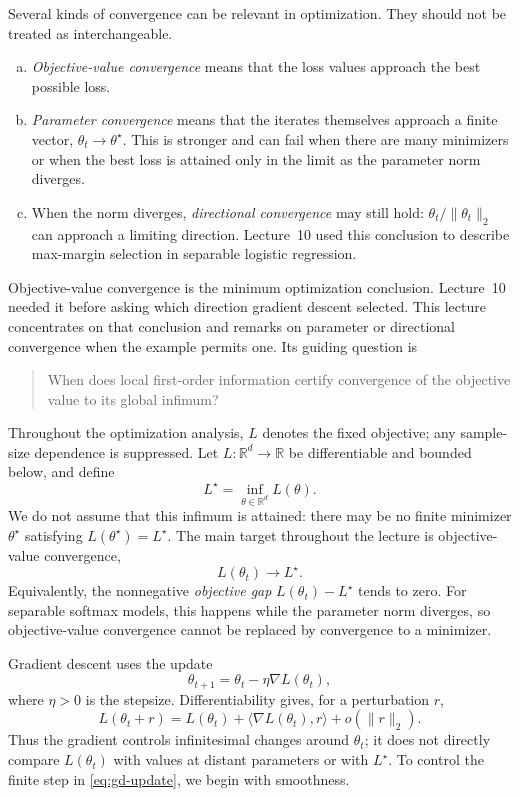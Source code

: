 \documentclass[11pt,twoside]{article}
\newcommand{\R}{\mathbb R}
\theoremstyle{definition}
\theoremstyle{remark}
\begin{document}
Several kinds of convergence can be relevant in optimization. They should not
be treated as interchangeable.
\begin{enumerate}[(a),leftmargin=*]
\item \emph{Objective-value convergence} means that the loss values approach
the best possible loss.
\item \emph{Parameter convergence} means that the iterates themselves approach
a finite vector, $\theta_t\to\theta^\star$. This is stronger and can fail when
there are many minimizers or when the best loss is attained only in the limit
as the parameter norm diverges.
\item When the norm diverges, \emph{directional convergence} may still hold:
$\theta_t/\|\theta_t\|_2$ can approach a limiting direction. Lecture~10 used
this conclusion to describe max-margin selection in separable logistic
regression.
\end{enumerate}
Objective-value convergence is the minimum optimization conclusion.
Lecture~10 needed it before asking which direction gradient descent selected.
This lecture concentrates on that conclusion and remarks on parameter or
directional convergence when the example permits one. Its guiding question is
\begin{quote}
When does local first-order information certify convergence of the objective
value to its global infimum?
\end{quote}

Throughout the optimization analysis, $L$ denotes the fixed objective;
any sample-size dependence is suppressed. Let $L:\R^d\to\R$ be
differentiable and bounded below, and define
\begin{equation}
 L^\star=\inf_{\theta\in\R^d}L(\theta).
 \label{eq:global-target}
\end{equation}
We do not assume that this infimum is attained: there may be no finite
minimizer $\theta^\star$ satisfying $L(\theta^\star)=L^\star$. The main target
throughout the lecture is objective-value convergence,
\[
 L(\theta_t)\longrightarrow L^\star.
\]
Equivalently, the nonnegative \emph{objective gap}
$L(\theta_t)-L^\star$ tends to zero. For separable softmax models, this happens
while the parameter norm diverges, so objective-value convergence cannot be
replaced by convergence to a minimizer.

Gradient descent uses the update
\begin{equation}
 \theta_{t+1}=\theta_t-\eta\nabla L(\theta_t),
 \label{eq:gd-update}
\end{equation}
where $\eta>0$ is the stepsize. Differentiability gives, for a perturbation
$r$,
\[
 L(\theta_t+r)
 =L(\theta_t)+\langle\nabla L(\theta_t),r\rangle
  +o(\|r\|_2).
\]
Thus the gradient controls infinitesimal changes around $\theta_t$; it does
not directly compare $L(\theta_t)$ with values at distant parameters or with
$L^\star$. To control the finite step in
\cref{eq:gd-update}, we begin with smoothness.
\end{document}
